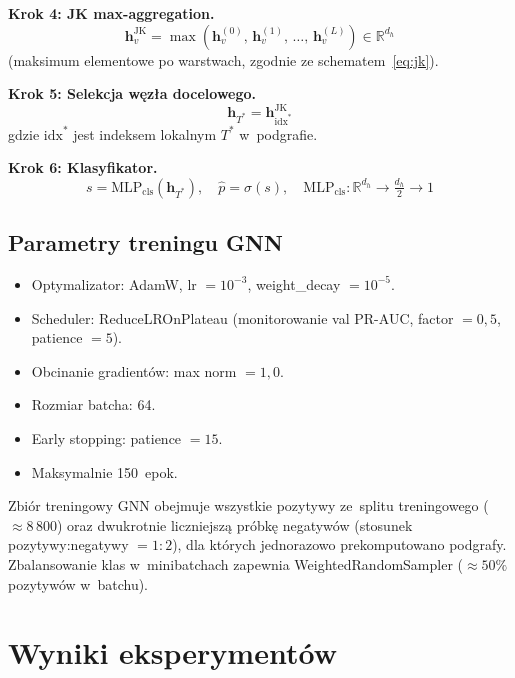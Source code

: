\documentclass{SGGW-thesis}
\begin{document}
\textbf{Krok 4: JK max-aggregation.}
\begin{equation}
    \mathbf{h}_v^{\mathrm{JK}} = \max\!\left(\mathbf{h}_v^{(0)},\, \mathbf{h}_v^{(1)},\, \ldots,\, \mathbf{h}_v^{(L)}\right) \in \mathbb{R}^{d_h}
    \label{eq:gnn_jk}
\end{equation}
(maksimum elementowe po warstwach, zgodnie ze schematem~\eqref{eq:jk}).

\textbf{Krok 5: Selekcja węzła docelowego.}
\begin{equation}
    \mathbf{h}_{T^*} = \mathbf{h}_{\mathrm{idx}^*}^{\mathrm{JK}}
    \label{eq:gnn_select}
\end{equation}
gdzie $\mathrm{idx}^*$ jest indeksem lokalnym $T^*$ w~podgrafie.

\textbf{Krok 6: Klasyfikator.}
\begin{equation}
    s = \mathrm{MLP}_{\mathrm{cls}}\!\left(\mathbf{h}_{T^*}\right), \quad \hat{p} = \sigma(s), \quad \mathrm{MLP}_{\mathrm{cls}} : \mathbb{R}^{d_h} \to \tfrac{d_h}{2} \to 1
    \label{eq:gnn_cls}
\end{equation}

\subsection{Parametry treningu GNN}

\begin{itemize}
  \item Optymalizator: AdamW, lr $= 10^{-3}$, weight\_decay $= 10^{-5}$.
  \item Scheduler: ReduceLROnPlateau (monitorowanie val PR-AUC, factor $= 0{,}5$, patience $= 5$).
  \item Obcinanie gradientów: max norm $= 1{,}0$.
  \item Rozmiar batcha: 64.
  \item Early stopping: patience $= 15$.
  \item Maksymalnie 150~epok.
\end{itemize}

Zbiór treningowy GNN obejmuje wszystkie pozytywy ze~splitu treningowego (${\approx}8\,800$) oraz
dwukrotnie liczniejszą próbkę negatywów (stosunek pozytywy:negatywy ${=}1{:}2$), dla których
jednorazowo prekomputowano podgrafy. Zbalansowanie klas w~minibatchach zapewnia
WeightedRandomSampler (${\approx}50\%$ pozytywów w~batchu).

\section{Wyniki eksperymentów}
\label{sec:results}
\end{document}
